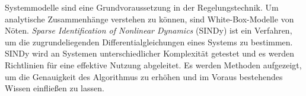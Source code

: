 Systemmodelle sind eine Grundvoraussetzung in der Regelungstechnik. Um analytische Zusammenhänge verstehen zu können, sind White-Box-Modelle von Nöten. \textit{Sparse Identification of Nonlinear Dynamics} (SINDy) ist ein Verfahren, um die zugrundeliegenden Differentialgleichungen eines Systems zu bestimmen. SINDy wird an Systemen unterschiedlicher Komplexität getestet und es werden Richtlinien für eine effektive Nutzung abgeleitet. Es werden Methoden aufgezeigt, um die Genauigkeit des Algorithmus zu erhöhen und im Voraus bestehendes Wissen einfließen zu lassen. 